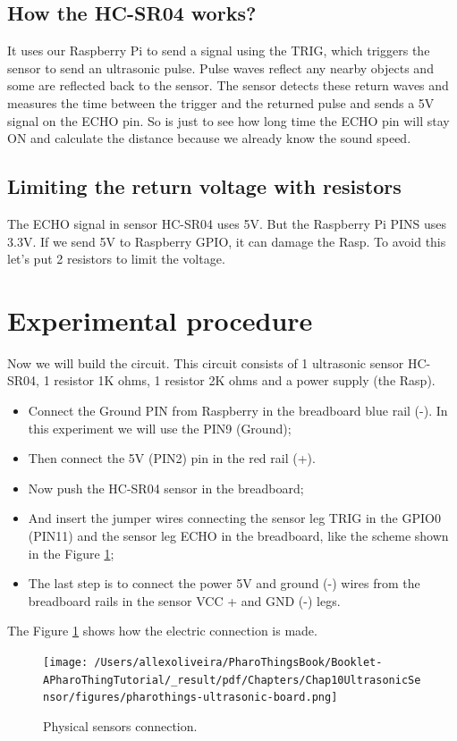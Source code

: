 \documentclass[10pt,twoside,english]{_support/latex/sbabook/sbabook}
\begin{document}
\subsection{How the HC-SR04 works?}
It uses our Raspberry Pi to send a signal using the TRIG, which triggers the sensor to send an ultrasonic pulse. Pulse waves reflect any nearby objects and some are reflected back to the sensor. The sensor detects these return waves and measures the time between the trigger and the returned pulse and sends a 5V signal on the ECHO pin. So is just to see how long time the ECHO pin will stay ON and calculate the distance because we already know the sound speed. 
\subsection{Limiting the return voltage with resistors}
The ECHO signal in sensor HC-SR04 uses 5V. But the Raspberry Pi PINS uses 3.3V. If we send 5V to Raspberry GPIO, it can damage the Rasp. To avoid this let's put 2 resistors to limit the voltage.  
\section{Experimental procedure}
Now we will build the circuit. This circuit consists of 1 ultrasonic sensor HC-SR04, 1 resistor 1K ohms, 1 resistor 2K ohms and a power supply (the Rasp).

\begin{itemize}
\item Connect the Ground PIN from Raspberry in the breadboard blue rail (-). In this experiment we will use the PIN9 (Ground);
\item Then connect the 5V (PIN2) pin in the red rail (+). 
\item Now push the HC-SR04 sensor in the breadboard;
\item And insert the jumper wires connecting the sensor leg TRIG in the GPIO0 (PIN11) and the sensor leg ECHO in the breadboard, like the scheme shown in the Figure \ref{physicalSonicSensors};
\item The last step is to connect the power 5V and ground (-) wires from the breadboard rails in the sensor VCC + and GND (-) legs.
\end{itemize}

The Figure \ref{physicalSonicSensors} shows how the electric connection is made.


\begin{figure}

\begin{center}
\texttt{[image: /Users/allexoliveira/PharoThingsBook/Booklet-APharoThingTutorial/\_result/pdf/Chapters/Chap10UltrasonicSensor/figures/pharothings-ultrasonic-board.png]}\caption{Physical sensors connection.\label{physicalSonicSensors}}\end{center}
\end{figure}
\end{document}
